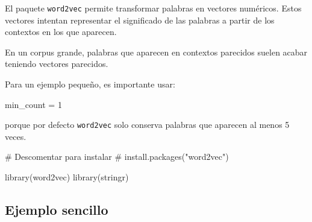 \documentclass[
  letterpaper,
  DIV=11,
  numbers=noendperiod]{scrreprt}
\newenvironment{Shaded}{\begin{snugshade}}{\end{snugshade}}
\newcommand{\CommentTok}[1]{\textcolor[rgb]{0.37,0.37,0.37}{#1}}
\newcommand{\DecValTok}[1]{\textcolor[rgb]{0.68,0.00,0.00}{#1}}
\newcommand{\FunctionTok}[1]{\textcolor[rgb]{0.28,0.35,0.67}{#1}}
\newcommand{\NormalTok}[1]{\textcolor[rgb]{0.00,0.23,0.31}{#1}}
\newcommand{\OtherTok}[1]{\textcolor[rgb]{0.00,0.23,0.31}{#1}}
\begin{document}
El paquete \texttt{word2vec} permite transformar palabras en vectores
numéricos. Estos vectores intentan representar el significado de las
palabras a partir de los contextos en los que aparecen.

En un corpus grande, palabras que aparecen en contextos parecidos suelen
acabar teniendo vectores parecidos.

Para un ejemplo pequeño, es importante usar:

\begin{Shaded}
\begin{Highlighting}[]
\NormalTok{min\_count }\OtherTok{=} \DecValTok{1}
\end{Highlighting}
\end{Shaded}

porque por defecto \texttt{word2vec} solo conserva palabras que aparecen
al menos 5 veces.

\begin{Shaded}
\begin{Highlighting}[]
\CommentTok{\# Descomentar para instalar}
\CommentTok{\# install.packages("word2vec")}

\FunctionTok{library}\NormalTok{(word2vec)}
\FunctionTok{library}\NormalTok{(stringr)}
\end{Highlighting}
\end{Shaded}

\subsection{Ejemplo sencillo}\label{ejemplo-sencillo}
\end{document}
